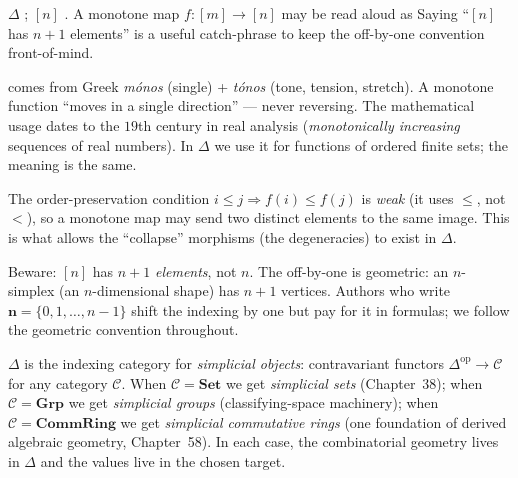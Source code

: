 \begin{howtosay}
$\Delta$ ; $[n]$
.
A monotone map $f : [m] \to [n]$ may be read aloud as  Saying ``$[n]$ has
$n+1$ elements'' is a useful catch-phrase to keep the off-by-one
convention front-of-mind.
\end{howtosay}

\begin{nameorigin}
 comes from Greek \emph{mónos} (single) + \emph{tónos}
(tone, tension, stretch). A monotone function ``moves in a single
direction'' — never reversing. The mathematical usage dates to the
$19$th century in real analysis (\emph{monotonically increasing} sequences
of real numbers). In $\Delta$ we use it for functions of ordered finite
sets; the meaning is the same.
\end{nameorigin}

\begin{readernote}
The order-preservation condition $i \leq j \Rightarrow f(i) \leq f(j)$ is
\emph{weak} (it uses $\leq$, not $<$), so a monotone map may send two
distinct elements to the same image. This is what allows the
``collapse'' morphisms (the degeneracies) to exist in $\Delta$.
\end{readernote}

\begin{remark}
Beware: $[n]$ has $n+1$ \emph{elements}, not $n$. The off-by-one is
geometric: an $n$-simplex (an $n$-dimensional shape) has $n+1$ vertices.
Authors who write $\boldsymbol{n} = \{0, 1, \ldots, n-1\}$ shift the
indexing by one but pay for it in formulas; we follow the geometric
convention throughout.
\end{remark}

\begin{remark}
$\Delta$ is the indexing category for \emph{simplicial objects}:
contravariant functors $\Delta^{\mathrm{op}} \to \mathcal{C}$ for any
category $\mathcal{C}$. When $\mathcal{C} = \mathbf{Set}$ we get
\emph{simplicial sets} (Chapter~38); when $\mathcal{C} = \mathbf{Grp}$
we get \emph{simplicial groups} (classifying-space machinery); when
$\mathcal{C} = \mathbf{CommRing}$ we get \emph{simplicial commutative
rings} (one foundation of derived algebraic geometry, Chapter~58). In
each case, the combinatorial geometry lives in $\Delta$ and the values
live in the chosen target.
\end{remark}

